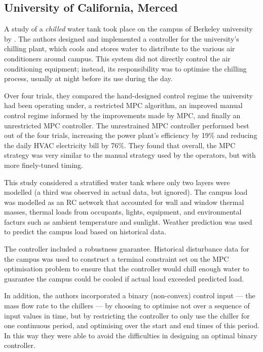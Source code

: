\subsection{University of California, Merced}

A study of a \emph{chilled} water tank took place on the campus of Berkeley university by \textcite{Ma12}.
The authors designed and implemented a controller for the university's chilling plant, which cools and stores water to distribute to the various air conditioners around campus.
This system did not directly control the air conditioning equipment; instead, its responsibility was to optimise the chilling process, usually at night before its use during the day.

Over four trials, they compared the hand-designed control regime the university had been operating under, a restricted MPC algorithm, an improved manual control regime informed by the improvements made by MPC, and finally an unrestricted MPC controller.
The unrestrained MPC controller performed best out of the four trials, increasing the power plant's efficiency by 19\% and reducing the daily HVAC electricity bill by 76\%.
They found that overall, the MPC strategy was very similar to the manual strategy used by the operators, but with more finely-tuned timing.

This study considered a stratified water tank where only two layers were modelled (a third was observed in actual data, but ignored).
The campus load was modelled as an RC network that accounted for wall and window thermal masses, thermal loads from occupants, lights, equipment, and environmental facturs such as ambient temperature and sunlight.
Weather prediction was used to predict the campus load based on historical data.

The controller included a robustness guarantee.
Historical disturbance data for the campus was used to construct a terminal constraint set on the MPC optimisation problem to ensure that the controller would chill enough water to guarantee the campus could be cooled if actual load exceeded predicted load.

In addition, the authors incorporated a binary (non-convex) control input --- the mass flow rate to the chillers --- by choosing to optimise not over a sequence of input values in time, but by restricting the controller to only use the chiller for one continuous period, and optimising over the start and end times of this period.
In this way they were able to avoid the difficulties in designing an optimal binary controller.

